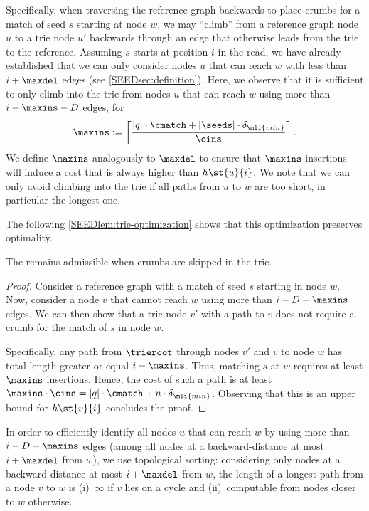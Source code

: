 Specifically, when traversing the reference graph backwards to place crumbs for
a match of seed $s$ starting at node $w$, we may ``climb'' from a reference
graph node $u$ to a trie node $u'$ backwards through an edge that otherwise
leads from the trie to the reference.
%
Assuming $s$ starts at position $i$ in the read, we have already established
that we can only consider nodes $u$ that can reach $w$ with less than
$i+\maxdel$ edges (see \cref{SEEDsec:definition}).
%
Here, we observe that it is sufficient to only climb into the trie from nodes
$u$ that can reach $w$ using more than~$i-\maxins-D$ edges, for
\begin{align}
	\maxins := \left\lceil \frac{\lvert q \rvert \cdot \cmatch + |\seeds| \cdot \delta_{\mli{min}}}{\cins} \right\rceil.
\end{align}
%
We define $\maxins$ analogously to $\maxdel$ to ensure that $\maxins$ insertions
will induce a cost that is always higher than $h\st{u}{i}$. We note that we can
only avoid climbing into the trie if all paths from $u$ to $w$ are too short, in
particular the longest one.

The following \cref{SEEDlem:trie-optimization} shows that this optimization
preserves optimality.

\begin{lem}
	\label{SEEDlem:trie-optimization}
	The \seedh remains admissible when crumbs are skipped in the trie.
\end{lem}
\begin{proof}
	Consider a reference graph with a match of seed $s$ starting in node $w$.
	Now, consider a node $v$ that cannot reach $w$ using more than $i-D-\maxins$
	edges.
	We can then show that a trie node $v'$ with a path to $v$ does not require a
	crumb for the match of $s$ in node $w$.

	Specifically, any path from $\trieroot$ through nodes $v'$ and $v$ to node
	$w$ has total length greater or equal $i-\maxins$. Thus, matching $s$ at $w$
	requires at least $\maxins$ insertions. Hence, the cost of such a path is at
	least $\maxins \cdot \cins = |q| \cdot \cmatch + n \cdot
	\delta_{\mli{min}}$. Observing that this is an upper bound for $h\st{v}{i}$
	concludes the proof.
\end{proof}

In order to efficiently identify all nodes $u$ that can reach $w$ by using more
than $i-D-\maxins$ edges (among all nodes at a backward-distance at most
$i+\maxdel$ from $w$), we use topological sorting: considering only nodes at a
backward-distance at most $i+\maxdel$ from $w$, the length of a longest path
from a node $v$ to $w$ is (i)~$\infty$ if $v$ lies on a cycle and
(ii)~computable from nodes closer to $w$ otherwise.
